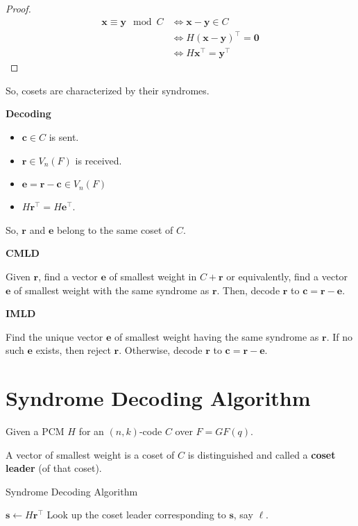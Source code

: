 \begin{proof}
    \begin{align*}
        \bm{x}\equiv \bm{y}\mod C
         & \iff \bm{x}-\bm{y}\in C           \\
         & \iff H(\bm{x}-\bm{y})^\top=\bm{0} \\
         & \iff H\bm{x}^\top=\bm{y}^\top
    \end{align*}
\end{proof}
So, cosets are characterized by their syndromes.

\textbf{Decoding}
\begin{itemize}
    \item $ \bm{c}\in C $ is sent.
    \item $ \bm{r}\in V_n(F) $ is received.
    \item $ \bm{e}=\bm{r}-\bm{c}\in V_n(F) $
    \item $ H\bm{r}^\top=H\bm{e}^\top $.
\end{itemize}
So, $ \bm{r} $ and $ \bm{e} $ belong to the same coset of $ C $.

\textbf{CMLD}

Given $ \bm{r} $, find a vector $ \bm{e} $ of smallest weight in $ C+\bm{r} $
or equivalently, find a vector $ \bm{e} $ of smallest weight with the same
syndrome as $ \bm{r} $. Then, decode $ \bm{r} $ to $ \bm{c}=\bm{r}-\bm{e} $.

\textbf{IMLD}

Find the unique vector $ \bm{e} $ of smallest weight having the same syndrome
as $ \bm{r} $. If no such $ \bm{e} $ exists, then reject $ \bm{r} $.
Otherwise, decode $ \bm{r} $ to $ \bm{c}=\bm{r}-\bm{e} $.

\section{Syndrome Decoding Algorithm}
Given a PCM $ H $ for an $ (n,k) $-code $ C $ over $ F=GF(q) $.

\begin{defbox}
    \begin{definition}
        A vector of smallest weight is a coset of $ C $ is distinguished and called
        a \textbf{coset leader} (of that coset).
    \end{definition}
\end{defbox}

\begin{algbox}
    \begin{algorithm}[H]
        \DontPrintSemicolon{}
        \caption{Syndrome Decoding Algorithm}

        $ \bm{s}\gets H\bm{r}^\top $\;
        Look up the coset leader corresponding to $ \bm{s} $, say $ \bm{\ell} $.\;
    \end{algorithm}
\end{algbox}


